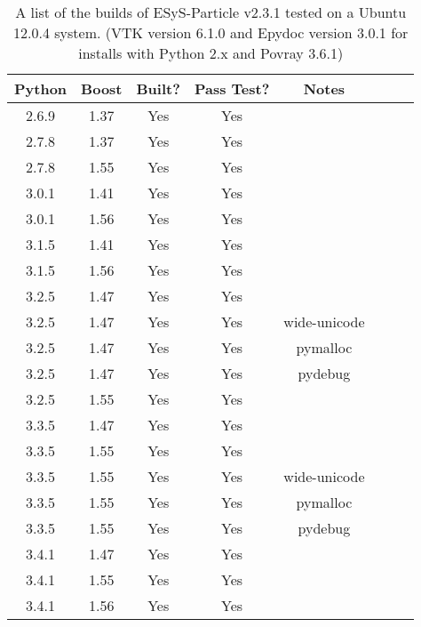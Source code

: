 \begin{table} [h]
    \centering
    \begin{tabular}{|c|c|c|c|c|c|c|c|}
    \hline
    Python & Boost & Built? & Pass Test? & Notes \\ \hline
    2.6.9  & 1.37  & Yes    & Yes        & \\
    2.7.8  & 1.37  & Yes    & Yes        & \\
    2.7.8  & 1.55  & Yes    & Yes        & \\
    3.0.1  & 1.41  & Yes    & Yes        & \\
    3.0.1  & 1.56  & Yes    & Yes        & \\
    3.1.5  & 1.41  & Yes    & Yes        & \\
    3.1.5  & 1.56  & Yes    & Yes        & \\
    3.2.5  & 1.47  & Yes    & Yes        & \\
    3.2.5  & 1.47  & Yes    & Yes        & wide-unicode\\
    3.2.5  & 1.47  & Yes    & Yes        & pymalloc \\
    3.2.5  & 1.47  & Yes    & Yes        & pydebug \\
    3.2.5  & 1.55  & Yes    & Yes        & \\
    3.3.5  & 1.47  & Yes    & Yes        & \\
    3.3.5  & 1.55  & Yes    & Yes        & \\
    3.3.5  & 1.55  & Yes    & Yes        & wide-unicode\\
    3.3.5  & 1.55  & Yes    & Yes        & pymalloc \\
    3.3.5  & 1.55  & Yes    & Yes        & pydebug \\
    3.4.1  & 1.47  & Yes    & Yes        & \\
    3.4.1  & 1.55  & Yes    & Yes        & \\
    3.4.1  & 1.56  & Yes    & Yes        & \\ \hline
    \end{tabular}
    \caption{A list of the builds of ESyS-Particle v2.3.1 tested on a Ubuntu 12.0.4 system. (VTK version 6.1.0 and Epydoc version 3.0.1 for installs with Python 2.x and Povray 3.6.1)}
\end{table}

